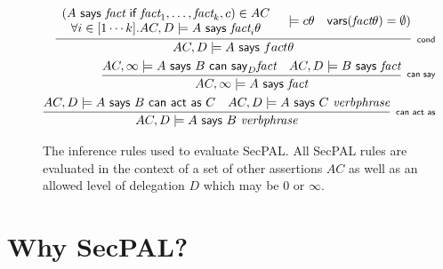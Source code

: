 \documentclass[thesis.tex]{subfiles}
\begin{document}
\begin{figure}
  \centering
  \begin{eqnarray*}
    \infer[\textsf{\scriptsize cond}]{%
      AC, D \models A\textsf{~says~}fact\theta
    }{%
      \begin{array}[c]{c}
        \left(A\textsf{~says~}\textit{fact}\textsf{~if~}\textit{fact}_1, \ldots, \textit{fact}_k, c\right) \in AC \\
        \forall i \in [1\cdots k]. AC,D\models A\textsf{~says~}\textit{fact}_i\theta
      \end{array}
      & \models{c\theta}
      & \textsf{vars}(\textit{fact}\theta) = \emptyset)
    }\\
    \infer[\textsf{\scriptsize can say}]{%
      AC, \infty \models A\textsf{~says~}\textit{fact}
    }{%
      AC, \infty \models A\textsf{~says~}B\textsf{~can~say}_D \textit{fact}
      & AC, D \models B\textsf{~says~}\textit{fact}
    } \\
    \infer[\textsf{\scriptsize can act as}]{%
      AC, D \models A\textsf{~says~}B~\textit{verbphrase}
    }{%
      AC, D \models A\textsf{~says~}B\textsf{~can~act~as~}C
      & AC, D \models A\textsf{~says~}C~\textit{verbphrase}
    }
  \end{eqnarray*}
  \caption[Inference rules used to evaluate {SecPAL}.]{The inference rules used to evaluate {SecPAL}. All {SecPAL} rules are
  evaluated in the context of a set of other assertions $AC$ as well as an
  allowed level of delegation $D$ which may be $0$ or $\infty$.}
\label{secpal:rules}
\end{figure}

\section{Why SecPAL?}
\end{document}
